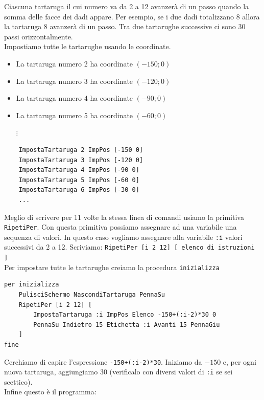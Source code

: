 Ciascuna tartaruga il cui numero va da 2 a 12 avanzerà di un passo quando la somma delle facce dei dadi appare. Per esempio, se i due dadi totalizzano 8 allora la tartaruga 8 avanzerà di un passo. Tra due tartarughe successive ci sono 30 passi orizzontalmente.\\
Impostiamo tutte le tartarughe usando le coordinate.
\begin{itemize}
	\item  La tartaruga numero 2 ha coordinate $(-150;0)$
	\item  La tartaruga numero 3 ha coordinate $(-120;0)$
	\item  La tartaruga numero 4 ha coordinate $(-90;0)$
	\item  La tartaruga numero 5 ha coordinate $(-60;0)$\\
	\begin{minipage}{8 cm}
		\begin{center}
			$\vdots$
		\end{center}
	\end{minipage}
\end{itemize}

\begin{lstlisting}
	ImpostaTartaruga 2 ImpPos [-150 0]
	ImpostaTartaruga 3 ImpPos [-120 0]
	ImpostaTartaruga 4 ImpPos [-90 0]
	ImpostaTartaruga 5 ImpPos [-60 0]
	ImpostaTartaruga 6 ImpPos [-30 0]
	...
\end{lstlisting}

Meglio di scrivere per 11 volte la stessa linea di comandi usiamo la primitiva \texttt{RipetiPer}. Con questa primitiva possiamo assegnare ad una variabile una sequenza di valori. In questo caso vogliamo assegnare alla variabile \texttt{:i} valori successivi da 2 a 12. Scriviamo:
\texttt{RipetiPer [i 2 12] [ elenco di istruzioni ]}\\

Per impostare tutte le tartarughe creiamo la procedura \texttt{inizializza}
\begin{lstlisting}
per inizializza
	PulisciSchermo NascondiTartaruga PennaSu
	RipetiPer [i 2 12] [ 
		ImpostaTartaruga :i ImpPos Elenco -150+(:i-2)*30 0
		PennaSu Indietro 15 Etichetta :i Avanti 15 PennaGiu 
	]
fine
\end{lstlisting}

Cerchiamo di capire l'espressione \texttt{-150+(:i-2)*30}. Iniziamo da $-150$ e, per ogni nuova tartaruga, aggiungiamo 30 (verificalo con diversi valori di \texttt{:i} se sei scettico).\\
Infine questo è il programma:

